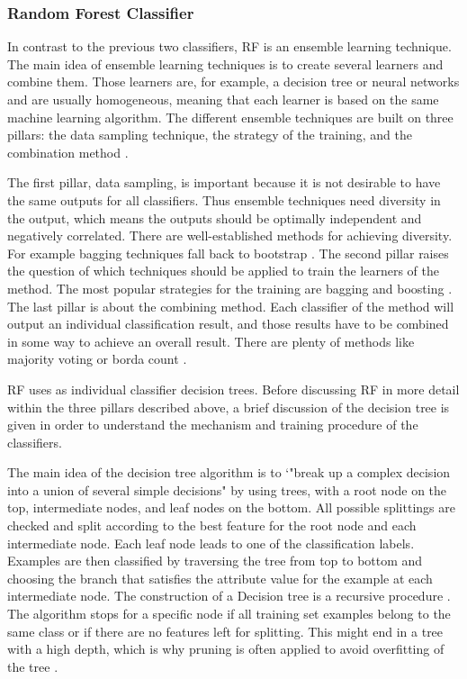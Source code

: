 \documentclass[12pt, a4paper, titlepage]{article}
\begin{document}
\subsubsection{Random Forest Classifier}
In contrast to the previous two classifiers, \ac{RF} is an ensemble learning technique. The main idea of ensemble learning techniques is to create several learners and combine them. Those learners are, for example, a decision tree or neural networks and are usually homogeneous, meaning that each learner is based on the same machine learning algorithm. The different ensemble techniques are built on three pillars: the data sampling technique, the strategy of the training, and the combination method \citep{polikar2012, zhou2009}. 

The first pillar, data sampling, is important because it is not desirable to have the same outputs for all classifiers. Thus ensemble techniques need diversity in the output, which means the outputs should be optimally independent and negatively correlated. There are well-established methods for achieving diversity. For example bagging techniques fall back to bootstrap \citep{polikar2012}. The second pillar raises the question of which techniques should be applied to train the learners of the method. The most popular strategies for the training are bagging and boosting \citep{polikar2012}. The last pillar is about the combining method. Each classifier of the method will output an individual classification result, and those results have to be combined in some way to achieve an overall result. There are plenty of methods like majority voting or borda count \citep{polikar2012}.

\ac{RF} uses as individual classifier decision trees. Before discussing \ac{RF} in more detail within the three pillars described above, a brief discussion of the decision tree is given in order to understand the mechanism and training procedure of the classifiers. 

The main idea of the decision tree algorithm is to `"break up a complex decision into a union of several simple decisions" \citep[660]{safavian1991} by using trees, with a root node on the top, intermediate nodes, and leaf nodes on the bottom. All possible splittings are checked and split according to the best feature for the root node and each intermediate node. Each leaf node leads to one of the classification labels. Examples are then classified by traversing the tree from top to bottom and choosing the branch that satisfies the attribute value for the example at each intermediate node. The construction of a Decision tree is a recursive procedure \citep{Berthold2020, xia2008, cutler2012}. The algorithm stops for a specific node if all training set examples belong to the same class or if there are no features left for splitting. This might end in a tree with a high depth, which is why pruning is often applied to avoid overfitting of the tree \citep{Berthold2020}.
\end{document}
